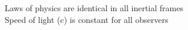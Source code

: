 \documentclass[preview]{standalone}
\begin{document}
Laws of physics are identical in all inertial frames\\Speed of light (c) is constant for all observers\\
\end{document}
